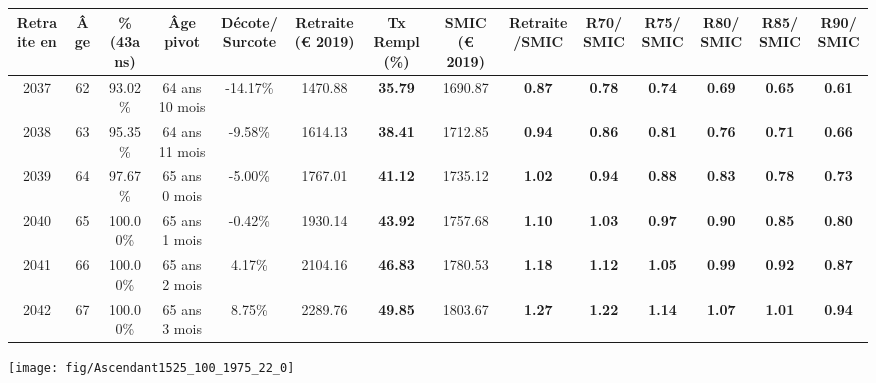 \begin{adjustbox}{max width=\textwidth} 
\begin{tabular}[htb]{|c|c||c|c|c||c|c||c|c||c|c|c|c|c|} 
\hline 
 Retraite en &  Âge &  \%(43ans) &  Âge pivot &  Décote/Surcote &  Retraite (\euro{} 2019) &  Tx Rempl(\%) &  SMIC (\euro{} 2019) &  Retraite/SMIC &  R70/SMIC &  R75/SMIC &  R80/SMIC &  R85/SMIC &  R90/SMIC \\ 
\hline \hline 
 2037 &  62 &  93.02\% &  64 ans 10 mois &  -14.17\% &  1470.88 &  {\bf 35.79} &  1690.87 &  {\bf {\color{red} 0.87}} &  {\bf {\color{red} 0.78}} &  {\bf {\color{red} 0.74}} &  {\bf {\color{red} 0.69}} &  {\bf {\color{red} 0.65}} &  {\bf {\color{red} 0.61}} \\ 
\hline 
 2038 &  63 &  95.35\% &  64 ans 11 mois &  -9.58\% &  1614.13 &  {\bf 38.41} &  1712.85 &  {\bf {\color{red} 0.94}} &  {\bf {\color{red} 0.86}} &  {\bf {\color{red} 0.81}} &  {\bf {\color{red} 0.76}} &  {\bf {\color{red} 0.71}} &  {\bf {\color{red} 0.66}} \\ 
\hline 
 2039 &  64 &  97.67\% &  65 ans 0 mois &  -5.00\% &  1767.01 &  {\bf 41.12} &  1735.12 &  {\bf 1.02} &  {\bf {\color{red} 0.94}} &  {\bf {\color{red} 0.88}} &  {\bf {\color{red} 0.83}} &  {\bf {\color{red} 0.78}} &  {\bf {\color{red} 0.73}} \\ 
\hline 
 2040 &  65 &  100.00\% &  65 ans 1 mois &  -0.42\% &  1930.14 &  {\bf 43.92} &  1757.68 &  {\bf 1.10} &  {\bf 1.03} &  {\bf {\color{red} 0.97}} &  {\bf {\color{red} 0.90}} &  {\bf {\color{red} 0.85}} &  {\bf {\color{red} 0.80}} \\ 
\hline 
 2041 &  66 &  100.00\% &  65 ans 2 mois &  4.17\% &  2104.16 &  {\bf 46.83} &  1780.53 &  {\bf 1.18} &  {\bf 1.12} &  {\bf 1.05} &  {\bf {\color{red} 0.99}} &  {\bf {\color{red} 0.92}} &  {\bf {\color{red} 0.87}} \\ 
\hline 
 2042 &  67 &  100.00\% &  65 ans 3 mois &  8.75\% &  2289.76 &  {\bf 49.85} &  1803.67 &  {\bf 1.27} &  {\bf 1.22} &  {\bf 1.14} &  {\bf 1.07} &  {\bf 1.01} &  {\bf {\color{red} 0.94}} \\ 
\hline 
\hline 
\end{tabular} 
\end{adjustbox} 
 
 \vspace{0.1cm} 

 {\hspace{-2.2cm}\texttt{[image: fig/Ascendant1525\_100\_1975\_22\_0]}} 

\newpage 
 
